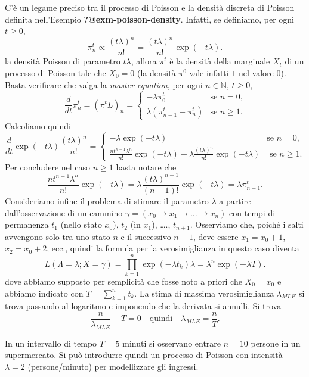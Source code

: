 \documentclass[
  italian,
  letterpaper,
]{book}
\newcommand{\bra}[1]{\left( #1 \right)}
\theoremstyle{definition}
\theoremstyle{remark}
\begin{document}
C'è un legame preciso tra il processo di Poisson e la densità discreta
di Poisson definita nell'Esempio \textbf{?@exm-poisson-density}.
Infatti, se definiamo, per ogni \(t \ge 0\),
\[ \pi^t_n \propto \frac{ (t \lambda)^n}{n!} =\frac{ (t \lambda)^n}{n!} \exp\bra{-t\lambda}.\]
la densità Poisson di parametro \(t \lambda\), allora \(\pi^t\) è la
densità della marginale \(X_t\) di un processo di Poisson tale che
\(X_0 = 0\) (la densità \(\pi^0\) vale infatti \(1\) nel valore \(0\)).
Basta verificare che valga la \emph{master equation}, per ogni
\(n \in \mathbb{N}\), \(t \ge 0\), \[ 
\frac{d}{dt} \pi^t_n = (\pi^t L)_n = \begin{cases} - \lambda \pi^t_0  &\text{se $n=0$,} \\
\lambda( \pi^t_{n-1}  - \pi^t_n ) & \text{se $n \ge 1$.}\end{cases}
\] Calcoliamo quindi
\[ \frac {d}{dt} \exp\bra{-t\lambda}\frac{ (t \lambda)^n}{n!} = \begin{cases} - \lambda  \exp\bra{- t \lambda} & \text{se $n=0$,}\\
  \frac{ n t^{n-1} \lambda^n}{n!} \exp\bra{- t \lambda} - \lambda  \frac{(t\lambda)^n}{n!} \exp\bra{- t \lambda} & \text{ se $n \ge 1$.}
  \end{cases}
\] Per concludere nel caso \(n \ge 1\) basta notare che
\[\frac{ n t^{n-1} \lambda^n}{n!} \exp\bra{- t \lambda}  = \lambda \frac{ (t\lambda)^{n-1}}{(n-1)!}  \exp\bra{- t \lambda} = \lambda \pi^t_{n-1}.\]
Consideriamo infine il problema di stimare il parametro \(\lambda\) a
partire dall'osservazione di un cammino
\(\gamma = (x_0 \to x_1 \to \ldots \to x_{n})\) con tempi di permanenza
\(t_1\) (nello stato \(x_0\)), \(t_2\) (in \(x_1\)), \ldots.,
\(t_{n+1}\). Osserviamo che, poiché i salti avvengono solo tra uno stato
\(n\) e il successivo \(n+1\), deve essere \(x_1 = x_0+1\),
\(x_2=x_0+2\), ecc., quindi la formula per la verosimiglianza in questo
caso diventa
\[ L( \Lambda = \lambda; X = \gamma) = \prod_{k=1}^n \exp\bra{- \lambda t_k} \lambda = \lambda^n  \exp\bra{- \lambda T}.
\] dove abbiamo supposto per semplicità che fosse noto a priori che
\(X_0 = x_0\) e abbiamo indicato con \(T = \sum_{k=1}^n t_k\). La stima
di massima verosimiglianza \(\lambda_{MLE}\) si trova passando al
logaritmo e imponendo che la derivata si annulli. Si trova
\[ \frac{n}{\lambda_{MLE}} - T = 0 \quad \text{quindi} \quad \lambda_{MLE} = \frac{n}{T}.\]

In un intervallo di tempo \(T = 5\) minuti si osservano entrare
\(n = 10\) persone in un supermercato. Si può introdurre quindi un
processo di Poisson con intensità \(\lambda = 2\) (persone/minuto) per
modellizzare gli ingressi.
\end{document}

